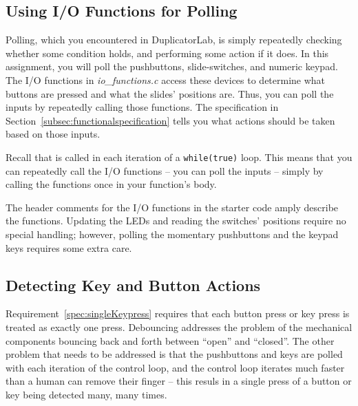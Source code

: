 \subsection{Using I/O Functions for Polling}

Polling, which you encountered in DuplicatorLab, is simply repeatedly checking whether some condition holds, and performing some action if it does.
In this assignment, you will poll the pushbuttons, slide-switches, and numeric keypad.
The I/O functions in \textit{io\_functions.c} access these devices to determine what buttons are pressed and what the slides' positions are.
Thus, you can poll the inputs by repeatedly calling those functions.
The specification in Section~\ref{subsec:functionalspecification} tells you what actions should be taken based on those inputs.

Recall that  is called in each iteration of a \lstinline{while(true)} loop.
This means that you can repeatedly call the I/O functions -- you can poll the inputs -- simply by calling the functions once in your  function's body.

The header comments for the I/O functions in the starter code amply describe the functions.
Updating the LEDs and reading the switches' positions require no special handling;
however, polling the momentary pushbuttons and the keypad keys requires some extra care.


\subsection{Detecting Key and Button Actions}

Requirement~\ref{spec:singleKeypress} requires that each button press or key press is treated as exactly one press.
Debouncing addresses the problem of the mechanical components bouncing back and forth between ``open'' and ``closed''.
The other problem that needs to be addressed is that the pushbuttons and keys are polled with each iteration of the control loop,
and the control loop iterates much faster than a human can remove their finger -- this resuls in a single press of a button or key being detected many, many times.

